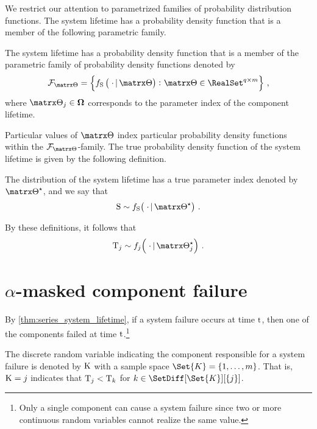 \documentclass[../main.tex]{subfiles}
\begin{document}
We restrict our attention to parametrized families of probability distribution functions. The system lifetime has a probability density function that is a member of the following parametric family.
\begin{definition}
    \label{def:sysparametric}
    The system lifetime has a probability density function that is a member of 
    the parametric family of probability density functions denoted by
    \begin{equation}
    \label{eq:paramsys}
    \pfam = \left \{ \spdf\left(\; \cdot \given \sysparam\right) \colon 
    \sysparam \in \RealSet^{q \times m} \right \}\,,
    \end{equation}
    where $\sysparam_j \in \boldsymbol\Omega$ corresponds to the parameter 
    index of the \jth component lifetime.
\end{definition}
Particular values of $\sysparam$ index particular probability density functions 
within the $\pfam$-family. The true probability density function of the system 
lifetime is given by the following definition.
\begin{definition}
    \label{def:true_param}
    The distribution of the system lifetime has a true parameter index denoted 
    by $\tparam\sysparam$, and we say that
    \begin{equation}
        \sv \sim \spdf\!\left(\;\cdot \given \tparam\sysparam\right)\,.
    \end{equation}
\end{definition}
By these definitions, it follows that
\begin{equation}
    \cv_j \sim \pdf_j\!\left(\; \cdot \given \tparam\sysparam_j\right)\,.
\end{equation}

\section{$\alpha$-masked component failure}
By \cref{thm:series_system_lifetime}, if a system failure occurs at time $\rm{t}$, then one of the components failed at time $\rm{t}$.\footnote{Only a single component can cause a system failure since two or more continuous random variables cannot realize the same value.}
\begin{definition}
\label{def:comp_cause}
The discrete random variable indicating the component responsible for a system failure is denoted by $\mathrm{K}$ with a sample space $\Set{K} = \{1,\ldots,m\}$. That is, $\mathrm{K} = j$ indicates that $\mathrm{T}_j < \mathrm{T}_k$ for $k \in \SetDiff[\Set{K}][\{ j \}]$.
\end{definition}
\end{document}
